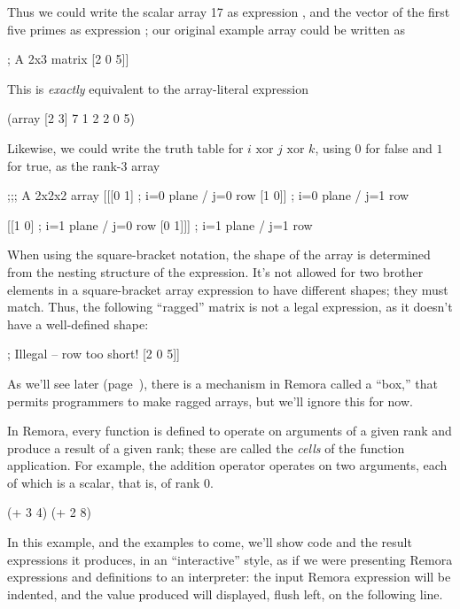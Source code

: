 Thus we could write the scalar array 17 as expression ,
and the vector of the first five primes as expression \ex{[2 3 5 7 11]};
our original example array could be written as
\begin{code}
[[7 1 2]    ; A 2x3 matrix
 [2 0 5]]\end{code}
This is \emph{exactly} equivalent to the array-literal expression
\begin{code}
(array [2 3] 7 1 2 2 0 5)\end{code}

Likewise, we could write the 
truth table for $i \text{ xor } j \text{ xor } k$,
using $0$ for false and $1$ for true, as the rank-3 array
\begin{code}
;;; A 2x2x2 array
[[[0 1]   ; i=0 plane / j=0 row
  [1 0]]  ; i=0 plane / j=1 row

 [[1 0]   ; i=1 plane / j=0 row
  [0 1]]] ; i=1 plane / j=1 row\end{code}

%
%

When using the square-bracket notation, the shape of the array
is determined from the nesting structure of the expression.
It's not allowed for two brother elements in a square-bracket
array expression to have different shapes; they must match.
Thus, the following ``ragged'' matrix is not a legal expression,
as it doesn't have a well-defined shape:
\begin{code}
[[7 1 2]
 [9 5]    ; Illegal -- row too short!
 [2 0 5]] \end{code}
As we'll see later (page~\pageref{sec:boxes}),
there is a mechanism in Remora called a ``box,''
that permits programmers to make ragged arrays, but we'll ignore this for now.



In Remora, every function is defined to operate on arguments of
a given rank and produce a result of a given rank;
these are called the \emph{cells} of the function application.
For example, the addition operator \ex{+} operates on two arguments,
each of which is a scalar, that is, of rank 0.
\begin{code}
    (+ 3 4)
    (+ 2 8)
\end{code}
In this example, and the examples to come, 
we'll show code and the result expressions it produces,
in an ``interactive'' style, 
as if we were presenting Remora expressions and definitions
to an interpreter:
the input Remora expression will be indented, and
the value produced will displayed, flush left, 
on the following line.

